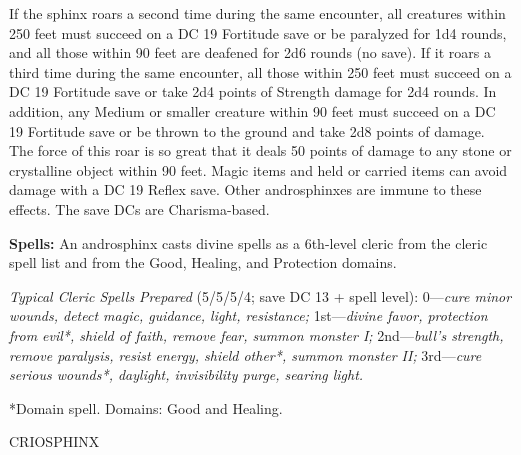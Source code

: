 \documentclass{article}
\begin{document}
If the sphinx roars a second time during the same encounter, all creatures within 
250 feet must succeed on a DC 19 Fortitude save or be paralyzed for 1d4 rounds, 
and all those within 90 feet are deafened for 2d6 rounds (no save). If it roars 
a third time during the same encounter, all those within 250 feet must succeed 
on a DC 19 Fortitude save or take 2d4 points of Strength damage for 2d4 rounds. 
In addition, any Medium or smaller creature within 90 feet must succeed on a DC 
19 Fortitude save or be thrown to the ground and take 2d8 points of damage. The 
force of this roar is so great that it deals 50 points of damage to any stone or 
crystalline object within 90 feet. Magic items and held or carried items can avoid 
damage with a DC 19 Reflex save. Other androsphinxes are immune to these effects. 
The save DCs are Charisma-based.

\textbf{Spells:} An androsphinx casts divine spells as a 6th-level cleric from 
the cleric spell list and from the Good, Healing, and Protection domains. 

\textit{Typical Cleric Spells Prepared }(5/5/5/4; save DC 13 + spell level): 0---\textit{cure 
minor wounds, detect magic, guidance, light, resistance; }1st---\textit{divine 
favor, protection from evil*, shield of faith, remove fear, summon monster I; }2nd---\textit{bull's 
strength, remove paralysis, resist energy, shield other*, summon monster II; }3rd---\textit{cure 
serious wounds*, daylight, invisibility purge, searing light.}

*Domain spell. Domains: Good and Healing.

\vspace{12pt}
CRIOSPHINX
\end{document}
